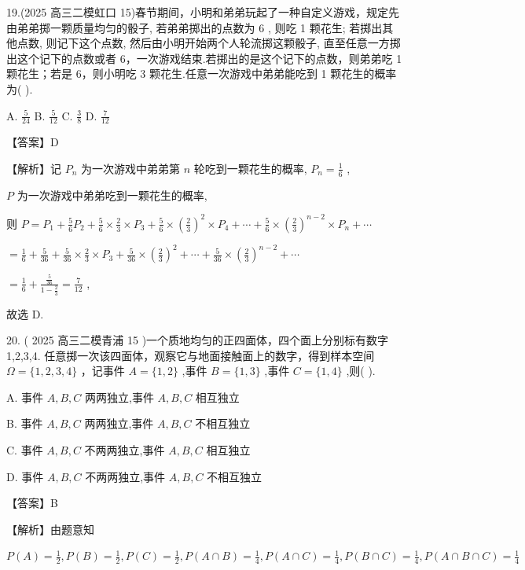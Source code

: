 \documentclass[10pt]{article}
\begin{document}
19.(2025 高三二模虹口 15)春节期间，小明和弟弟玩起了一种自定义游戏，规定先由弟弟掷一颗质量均匀的骰子, 若弟弟掷出的点数为 6 , 则吃 1 颗花生; 若掷出其他点数, 则记下这个点数, 然后由小明开始两个人轮流掷这颗骰子, 直至任意一方掷出这个记下的点数或者 6，一次游戏结束.若掷出的是这个记下的点数，则弟弟吃 1 颗花生；若是 6，则小明吃 3 颗花生.任意一次游戏中弟弟能吃到 1 颗花生的概率为( ).

A. \(\frac{5}{24}\) B. \(\frac{5}{12}\) C. \(\frac{3}{8}\) D. \(\frac{7}{12}\)

【答案】D

【解析】记 \({P}_{n}\) 为一次游戏中弟弟第 \(n\) 轮吃到一颗花生的概率, \({P}_{n} = \frac{1}{6}\) ,

\(P\) 为一次游戏中弟弟吃到一颗花生的概率,

则 \(P = {P}_{1} + \frac{5}{6}{P}_{2} + \frac{5}{6} \times  \frac{2}{3} \times  {P}_{3} + \frac{5}{6} \times  {\left( \frac{2}{3}\right) }^{2} \times  {P}_{4} + \cdots  + \frac{5}{6} \times  {\left( \frac{2}{3}\right) }^{n - 2} \times  {P}_{n} + \cdots\)

\(= \frac{1}{6} + \frac{5}{36} + \frac{5}{36} \times  \frac{2}{3} \times  {P}_{3} + \frac{5}{36} \times  {\left( \frac{2}{3}\right) }^{2} + \cdots  + \frac{5}{36} \times  {\left( \frac{2}{3}\right) }^{n - 2} + \cdots\)

\(= \frac{1}{6} + \frac{\frac{5}{36}}{1 - \frac{2}{3}} = \frac{7}{12}\) ,

故选 D.

20. ( 2025 高三二模青浦 15 )一个质地均匀的正四面体，四个面上分别标有数字1,2,3,4. 任意掷一次该四面体，观察它与地面接触面上的数字，得到样本空间 \(\Omega  = \{ 1,2,3,4\}\) ，记事件 \(A = \{ 1,2\}\) ,事件 \(B = \{ 1,3\}\) ,事件 \(C = \{ 1,4\}\) ,则(   ).

A. 事件 \(A,B,C\) 两两独立,事件 \(A,B,C\) 相互独立

B. 事件 \(A,B,C\) 两两独立,事件 \(A,B,C\) 不相互独立

C. 事件 \(A,B,C\) 不两两独立,事件 \(A,B,C\) 相互独立

D. 事件 \(A,B,C\) 不两两独立,事件 \(A,B,C\) 不相互独立

【答案】B

【解析】由题意知

\(P\left( A\right)  = \frac{1}{2},P\left( B\right)  = \frac{1}{2},P\left( C\right)  = \frac{1}{2},P\left( {A \cap  B}\right)  = \frac{1}{4},P\left( {A \cap  C}\right)  = \frac{1}{4},P\left( {B \cap  C}\right)  = \frac{1}{4},P\left( {A \cap  B \cap  C}\right)  = \frac{1}{4}\)
\end{document}
